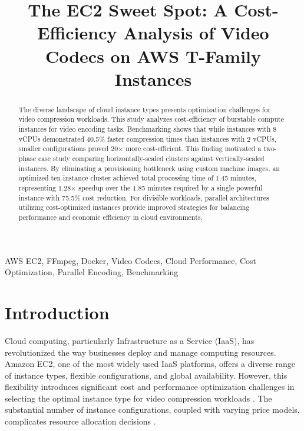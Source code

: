 \documentclass[conference]{IEEEtran}
\begin{document}
	
	\title{The EC2 Sweet Spot: A Cost-Efficiency Analysis of Video Codecs on AWS T-Family Instances}
	
	\author{
	}
	
	\maketitle
	
	\begin{abstract}
		The diverse landscape of cloud instance types presents optimization challenges for video compression workloads. This study analyzes cost-efficiency of burstable compute instances for video encoding tasks. Benchmarking shows that while instances with 8 vCPUs demonstrated 40.5\% faster compression times than instances with 2 vCPUs, smaller configurations proved 20× more cost-efficient. This finding motivated a two-phase case study comparing horizontally-scaled clusters against vertically-scaled instances. By eliminating a provisioning bottleneck using custom machine images, an optimized ten-instance cluster achieved total processing time of 1.45 minutes, representing 1.28× speedup over the 1.85 minutes required by a single powerful instance with 75.5\% cost reduction. For divisible workloads, parallel architectures utilizing cost-optimized instances provide improved strategies for balancing performance and economic efficiency in cloud environments.
	\end{abstract}
	
	\begin{IEEEkeywords}
		AWS EC2, FFmpeg, Docker, Video Codecs, Cloud Performance, Cost Optimization, Parallel Encoding, Benchmarking
	\end{IEEEkeywords}
	
	\section{Introduction}
	
	Cloud computing, particularly Infrastructure as a Service (IaaS), has revolutionized the way businesses deploy and manage computing resources. Amazon EC2, one of the most widely used IaaS platforms, offers a diverse range of instance types, flexible configurations, and global availability. However, this flexibility introduces significant cost and performance optimization challenges in selecting the optimal instance type for video compression workloads \cite{Maas2025}. The substantial number of instance configurations, coupled with varying price models, complicates resource allocation decisions \cite{mahida-ankur}.
	
\end{document}
